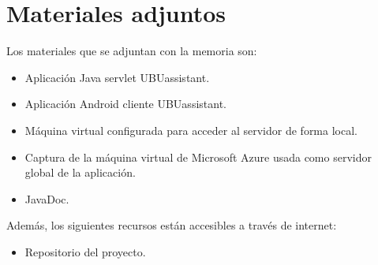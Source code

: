 \section{Materiales adjuntos}\label{materiales-adjuntos}

Los materiales que se adjuntan con la memoria son: 

\begin{itemize}
	\tightlist
	\item
	Aplicación Java servlet UBUassistant.
	\item
	Aplicación Android cliente UBUassistant.
	\item
	Máquina virtual configurada para acceder al servidor de forma local.
	\item
	Captura de la máquina virtual de Microsoft Azure usada como servidor global de la aplicación.
	\item	
	JavaDoc.
\end{itemize}

Además, los siguientes recursos están accesibles a través de internet:

\begin{itemize}
	\tightlist
	\item
	Repositorio del proyecto. \cite{ubuassistant:repo}
\end{itemize}
